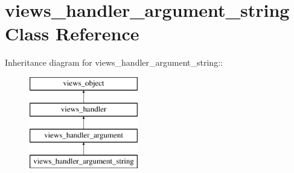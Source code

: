 \hypertarget{classviews__handler__argument__string}{
\section{views\_\-handler\_\-argument\_\-string Class Reference}
\label{classviews__handler__argument__string}
}
Inheritance diagram for views\_\-handler\_\-argument\_\-string::\begin{figure}[H]
\begin{center}
\leavevmode
\includegraphics[height=4cm]{classviews__handler__argument__string}
\end{center}
\end{figure}
